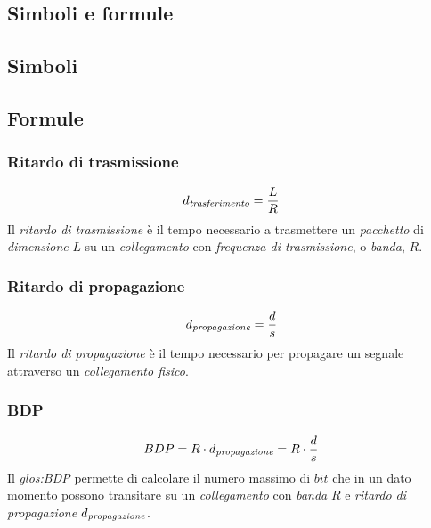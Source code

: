 \begin{appendices}
\chapter{Simboli e formule}
\section{Simboli}
\begin{enumerate}
    \setcounter{enumii}{0}
\end{enumerate}

\section{Formule}
\subsection{Ritardo di trasmissione}\label{ssec:num1}
\[d_{\emph{trasferimento}}=\frac{L}{R}\]
Il \emph{ritardo di trasmissione} è il tempo necessario a trasmettere un
\emph{pacchetto} di \emph{dimensione} $L$ su un \emph{collegamento} con
\emph{frequenza di trasmissione}, o \emph{banda}, $R$.

\subsection{Ritardo di propagazione}\label{ssec:num2}
\[d_{\emph{propagazione}}=\frac{d}{s}\]
Il \emph{ritardo di propagazione} è il tempo necessario per propagare un segnale
attraverso un \emph{collegamento fisico}.

\subsection{BDP}\label{ssec:num3}
\[BDP=R\cdot d_{\emph{propagazione}}=R\cdot\frac{d}{s}\]
Il \emph{\gls{glos:BDP}} permette di calcolare il numero massimo di $bit$ che
in un dato momento possono transitare su un \emph{collegamento} con \emph{banda}
$R$ e \emph{ritardo di propagazione} $d_{\emph{propagazione}}$.


\end{appendices}
